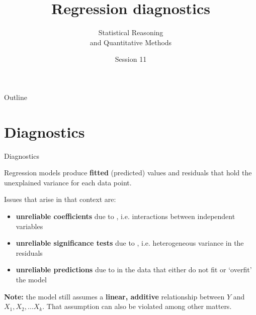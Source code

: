 \documentclass{beamer}
\author{Statistical Reasoning\\and Quantitative Methods}
\title{Regression diagnostics}
\institute{François Briatte \& Ivaylo Petev}
\date{Session 11}
\begin{document}
		
	\begin{frame}[t,plain]
		\titlepage
	\end{frame}
	
	\begin{frame}[t]{Outline}
		\tableofcontents[hideallsubsections]
	\end{frame}
	

	\section{Diagnostics}
	\begin{frame}[t]{Diagnostics}
		
		Regression models produce \textbf{fitted} (predicted) values and residuals that hold the unexplained variance for each data point.
		
		Issues that arise in that context are:
				
		\begin{itemize}
		 	\item \textbf{unreliable coefficients} due to , i.e. interactions between independent variables
		 	\item \textbf{unreliable significance tests} due to , i.e. heterogeneous variance in the residuals
		 	\item \textbf{unreliable predictions} due to  in the data that either do not fit or `overfit' the model
		\end{itemize}
		
		\vspace{.5em}
		\textbf{Note:} the model still assumes a \textbf{linear, additive} relationship between $Y$ and $X_1, X_2, \ldots X_k$. That assumption can also be violated among other matters.
		
	\end{frame}
\end{document}
